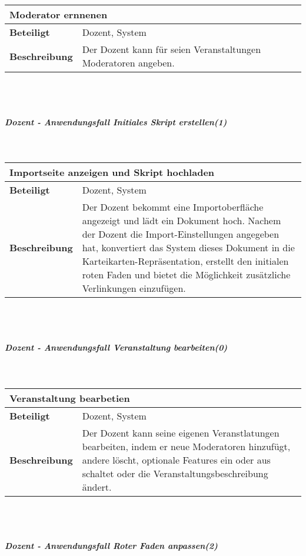 \documentclass[12pt,a4paper]{article}
\begin{document}
\begin{tabular}{l p{10cm}}
\multicolumn{2}{l}{\textbf{Moderator ernnenen}} \\ \hline
\textbf{Beteiligt} & Dozent, System \\ \hline 
\textbf{Beschreibung} & Der Dozent kann für seien Veranstaltungen Moderatoren angeben.\\ 
\hline 
\end{tabular}\\\\
\subparagraph{Dozent - Anwendungsfall \glqq Initiales Skript erstellen\grqq (1)}\mbox{}\\

\begin{tabular}{l p{10cm}}
\multicolumn{2}{l}{\textbf{Importseite anzeigen und Skript hochladen}} \\ \hline
\textbf{Beteiligt} & Dozent, System \\ \hline 
\textbf{Beschreibung} & Der Dozent bekommt eine Importoberfläche angezeigt und lädt ein Dokument hoch. Nachem der Dozent die Import-Einstellungen angegeben hat, konvertiert das System dieses Dokument in die Karteikarten-Repräsentation, erstellt den initialen roten Faden und bietet die Möglichkeit zusätzliche Verlinkungen einzufügen.\\ 
\hline 
\end{tabular}\\\\
\subparagraph{Dozent - Anwendungsfall \glqq Veranstaltung bearbeiten\grqq (0)}\mbox{}\\

\begin{tabular}{l p{10cm}}
\multicolumn{2}{l}{\textbf{Veranstaltung bearbetien}} \\ \hline
\textbf{Beteiligt} & Dozent, System \\ \hline 
\textbf{Beschreibung} & Der Dozent kann seine eigenen Veranstlatungen bearbeiten, indem er neue Moderatoren hinzufügt, andere löscht, optionale Features ein oder aus schaltet oder die Veranstaltungsbeschreibung ändert.\\ 
\hline 
\end{tabular}\\\\
\subparagraph{Dozent - Anwendungsfall \glqq Roter Faden anpassen\grqq (2)}\mbox{}\\
\end{document}
